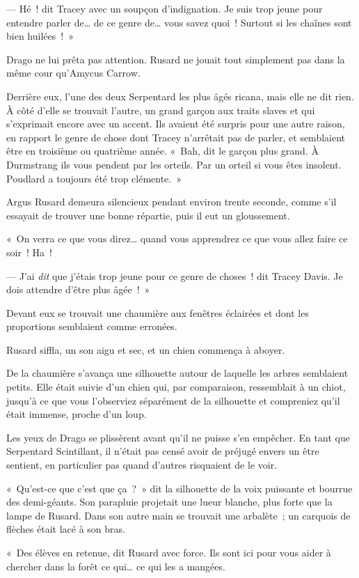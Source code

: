 --- Hé~! dit Tracey avec un soupçon d'indignation.
Je suis trop jeune pour entendre parler de… de ce genre de… vous savez quoi~!
Surtout si les chaînes sont bien huilées~!~»

Drago ne lui prêta pas attention.
Rusard ne jouait tout simplement pas dans la même cour qu'Amycus Carrow.

Derrière eux, l'une des deux Serpentard les plus âgés ricana, mais elle ne dit rien.
À côté d'elle se trouvait l'autre, un grand garçon aux traits slaves et qui s'exprimait encore avec un accent.
Ils avaient été surpris pour une autre raison, en rapport le genre de chose dont Tracey n'arrêtait pas de parler, et semblaient être en troisième ou quatrième année.
«~Bah, dit le garçon plus grand.
À Durmstrang ils vous pendent par les orteils.
Par un orteil si vous êtes insolent.
Poudlard a toujours été trop clémente.~»

Argus Rusard demeura silencieux pendant environ trente seconde, comme s'il essayait de trouver une bonne répartie, puis il eut un gloussement.

«~On verra ce que vous direz… quand vous apprendrez ce que vous allez faire ce soir~!
Ha~!

--- J'ai \emph{dit} que j'étais trop jeune pour ce genre de choses~! dit Tracey Davis.
Je dois attendre d'être plus âgée~!~»

Devant eux se trouvait une chaumière aux fenêtres éclairées et dont les proportions semblaient comme erronées.

Rusard siffla, un son aigu et sec, et un chien commença à aboyer.

De la chaumière s'avança une silhouette autour de laquelle les arbres semblaient petits.
Elle était suivie d'un chien qui, par comparaison, ressemblait à un chiot, jusqu'à ce que vous l'observiez séparément de la silhouette et compreniez qu'il était immense, proche d'un loup.

Les yeux de Drago se plissèrent avant qu'il ne puisse s'en empêcher.
En tant que Serpentard Scintillant, il n'était pas censé avoir de préjugé envers un être sentient, en particulier pas quand d'autres risquaient de le voir.

«~Qu'est-ce que c'est que ça~?~»
dit la silhouette de la voix puissante et bourrue des demi-géants.
Son parapluie projetait une lueur blanche, plus forte que la lampe de Rusard.
Dans son autre main se trouvait une arbalète~; un carquois de flèches était lacé à son bras.

«~Des élèves en retenue, dit Rusard avec force.
Ils sont ici pour vous aider à chercher dans la forêt ce qui… ce qui les a mangées.

